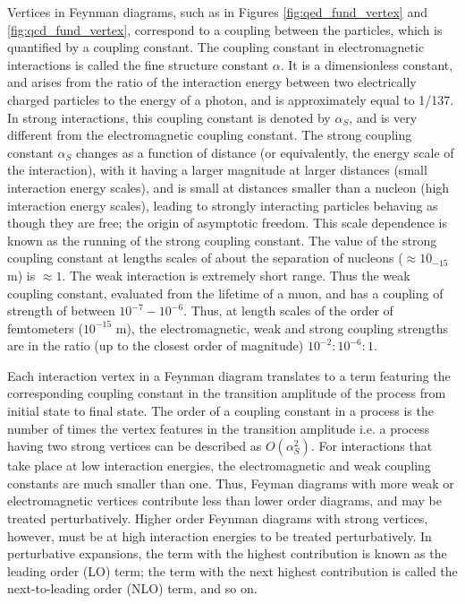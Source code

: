\documentclass[12pt,a4paper,openright,twoside]{report}
\begin{document}
Vertices in Feynman diagrams, such as in Figures \ref{fig:qed_fund_vertex} and \ref{fig:qcd_fund_vertex}, correspond to a coupling between the particles, which is quantified by a coupling constant. The coupling constant in electromagnetic interactions is called the fine structure constant $\alpha$. It is a dimensionless constant, and arises from the ratio of the interaction energy between two electrically charged particles to the energy of a photon, and is approximately equal to 1/137. In strong interactions, this coupling constant is denoted by $\alpha_{S}$, and is very different from the electromagnetic coupling constant. The strong coupling constant $\alpha_{S}$ changes as a function of distance (or equivalently, the energy scale of the interaction), with it having a larger magnitude at larger distances (small interaction energy scales), and is small at distances smaller than a nucleon (high interaction energy scales), leading to strongly interacting particles behaving as though they are free; the origin of asymptotic freedom. This scale dependence is known as the running of the strong coupling constant. The value of the strong coupling constant at lengths scales of about the separation of nucleons ($\approx 10_{-15}$ m) is $\approx 1$. The weak interaction is extremely short range. Thus the weak coupling constant, evaluated from the lifetime of a muon, and has a coupling of strength of between $10^{-7}-10^{-6}$. Thus, at length scales of the order of femtometers ($10^{-15}$ m), the electromagnetic, weak and strong coupling strengths are in the ratio (up to the closest order of magnitude) $10^{-2}:10^{-6}:1$.

Each interaction vertex in a Feynman diagram translates to a term featuring the corresponding coupling constant in the transition amplitude of the process from initial state to final state. The order of a coupling constant in a process is the number of times the vertex features in the transition amplitude i.e. a process having two strong vertices can be described as $O(\alpha_{S}^2)$. For interactions that take place at low interaction energies, the electromagnetic and weak coupling constants are much smaller than one. Thus, Feyman diagrams with more weak or electromagnetic vertices contribute less than lower order diagrams, and may be treated perturbatively. Higher order Feynman diagrams with strong vertices, however, must be at high interaction energies to be treated perturbatively. In perturbative expansions, the term with the highest contribution is known as the leading order (LO) term; the term with the next highest contribution is called the next-to-leading order (NLO) term, and so on.
\end{document}
